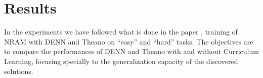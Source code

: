 \section{Results}
In the experiments we have followed what is done in the paper \cite{NRAM:2016}, training of NRAM with DENN and Theano on ``easy'' and ``hard'' tasks. The objectives are to compare the performances of DENN and Theano with and without Curriculum Learning, focusing specially to the generalization capacity of the discovered solutions.\newline
\begin{table}[t]
	\centering

\end{table}
